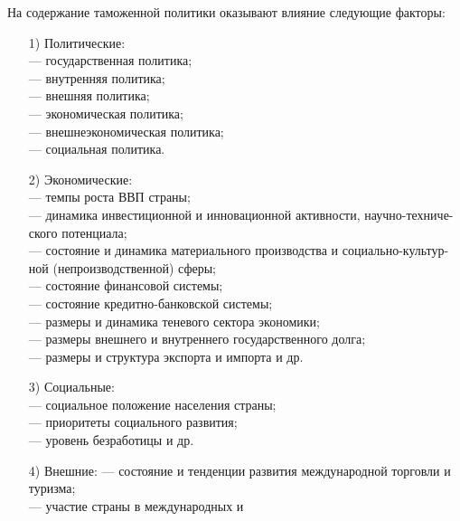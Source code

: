На содержание таможенной политики оказывают влияние следующие факторы:
\begin{enumerate}
	\item [1)] Политические:\\
	--- государственная политика;\\
	--- внутренняя политика;\\
	--- внешняя политика;\\
	--- экономическая политика;\\
	--- внешнеэкономическая политика;\\
	--- социальная политика.
	\item [2)] Экономические:\\
	--- темпы роста ВВП страны;\\
	--- динамика инвестиционной и инновационной активности, научно-техниче-ского потенциала;\\
	--- состояние и динамика материального производства и социально-культур-ной (непроизводственной) сферы;\\
	--- состояние финансовой системы;\\
	--- состояние кредитно-банковской системы;\\
	--- размеры и динамика теневого сектора экономики;\\
	--- размеры внешнего и внутреннего государственного долга;\\
	--- размеры и структура экспорта и импорта и др.
	\item [3)] Социальные:\\
	--- социальное положение населения страны;\\
	--- приоритеты социального развития;\\
	--- уровень безработицы и др.
	\item [4)] Внешние:
	--- состояние и тенденции развития международной торговли и туризма;\\
	--- участие страны в международных и 
\end{enumerate}
















